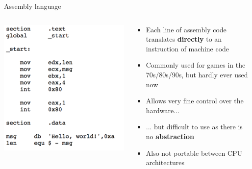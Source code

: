 \begin{frame}{Assembly language}
	\begin{columns}
		\begin{column}{0.4\textwidth}
			\includegraphics[width=\textwidth]{assembly}
		\end{column}
		\begin{column}{0.58\textwidth}
			\begin{itemize}
				\pause\item Each line of assembly code translates \textbf{directly} to an instruction of machine code
				\pause\item Commonly used for games in the 70s/80s/90s, but hardly ever used now
				\pause\item Allows very fine control over the hardware...
				\pause\item ... but difficult to use as there is no \textbf{abstraction}
				\pause\item Also not portable between CPU architectures
			\end{itemize}
		\end{column}
	\end{columns}
\end{frame}

